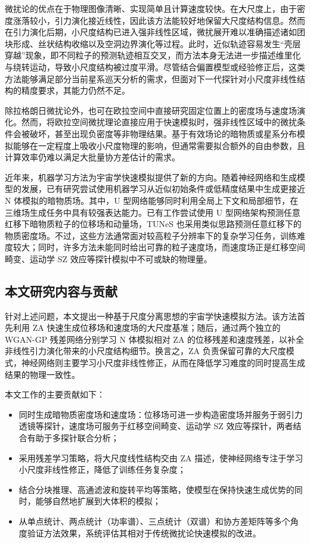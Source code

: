 微扰论的优点在于物理图像清晰、实现简单且计算速度较快。在大尺度上，由于密度涨落较小，引力演化接近线性，因此该方法能较好地保留大尺度结构信息。然而在引力演化后期，小尺度结构已进入强非线性区域，微扰展开难以准确描述诸如团块形成、丝状结构收缩以及空洞边界演化等过程。此时，近似轨迹容易发生“壳层穿越”现象，即不同粒子的预测轨迹相互交叉，而方法本身无法进一步描述维里化与绕转运动，导致小尺度结构被过度平滑。尽管结合偏置模型或经验修正后，这类方法能够满足部分当前星系巡天分析的需求，但面对下一代探针对小尺度非线性结构的精度要求，其能力仍然不足。

除拉格朗日微扰论外，也可在欧拉空间中直接研究固定位置上的密度场与速度场演化\citep{jeong2006perturbation,taruya2018grid}。然而，将欧拉空间微扰理论直接应用于快速模拟时，强非线性区域中的微扰条件会被破坏，甚至出现负密度等非物理结果。基于有效场论的暗物质或星系分布模拟能够在一定程度上吸收小尺度物理的影响，但通常需要拟合额外的自由参数，且计算效率仍难以满足大批量协方差估计的需求\citep{carrasco2014eft}。

近年来，机器学习方法为宇宙学快速模拟提供了新的方向。随着神经网络和生成模型的发展，已有研究尝试使用机器学习从近似初始条件或低精度结果中生成更接近 N 体模拟的暗物质场\citep{he2019learning,oliveira2020fast,jamieson2023field,jamieson2024field}。其中，U 型网络能够同时利用全局上下文和局部细节，在三维场生成任务中具有较强表达能力。已有工作尝试使用 U 型网络架构预测任意红移下暗物质粒子的位移场和动量场，TUNeS 也采用类似思路预测任意红移下的物质密度场\citep{kang2026tunes}。不过，这些方法通常面对较高粒子分辨率下的复杂学习任务，训练难度较大；同时，许多方法未能同时给出可靠的粒子速度场，而速度场正是红移空间畸变、运动学 SZ 效应等探针模拟中不可或缺的物理量。

\subsection{本文研究内容与贡献}

针对上述问题，本文提出一种基于尺度分离思想的宇宙学快速模拟方法。该方法首先利用 ZA 快速生成位移场和速度场的大尺度基准；随后，通过两个独立的 WGAN-GP 残差网络分别学习 N 体模拟相对 ZA 的位移残差和速度残差，以补全非线性引力演化带来的小尺度结构细节。换言之，ZA 负责保留可靠的大尺度模式，神经网络则主要学习小尺度非线性修正，从而在降低学习难度的同时提高生成结果的物理一致性。

本文工作的主要贡献如下：
\begin{itemize}
  \item 同时生成暗物质密度场和速度场：位移场可进一步构造密度场并服务于弱引力透镜等探针，速度场可服务于红移空间畸变、运动学 SZ 效应等探针，两者结合有助于多探针联合分析；
  \item 采用残差学习策略，将大尺度线性结构交由 ZA 描述，使神经网络专注于学习小尺度非线性修正，降低了训练任务复杂度；
  \item 结合分块推理、高通滤波和旋转平均等策略，使模型在保持快速生成优势的同时，能够自然地扩展到大体积的模拟；
  \item 从单点统计、两点统计（功率谱）、三点统计（双谱）和协方差矩阵等多个角度验证方法效果，系统评估其相对于传统微扰论快速模拟的改进。
\end{itemize}

